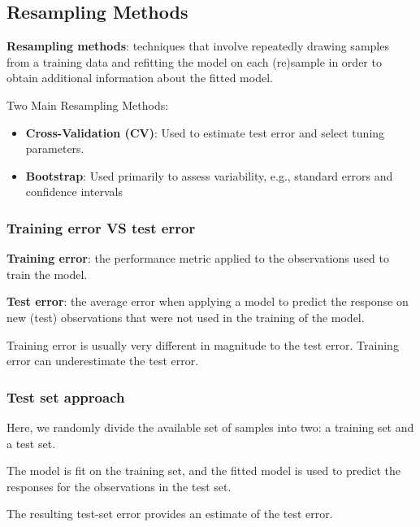 \subsection{Resampling Methods}

\noindent \textbf{Resampling methods}: techniques that involve repeatedly drawing samples from a training data and refitting the model on each (re)sample in order to obtain additional information about the fitted model.

\noindent Two Main Resampling Methods:

\begin{itemize}
    \item \textbf{Cross-Validation (CV)}: Used to estimate test error and select tuning parameters.
    \item \textbf{Bootstrap}: Used primarily to assess variability, e.g., standard errors and confidence intervals
\end{itemize}

\subsubsection{Training error VS test error}

\indent 

\noindent\textbf{Training error}: the performance metric applied to the observations used to train the model.

\noindent\textbf{Test error}: the average error when applying a model to predict the response on new (test) observations that were not used in the training of the model.

\bigskip

Training error is usually very different in magnitude to the test error. Training error can underestimate the test error.

\subsubsection{Test set approach}

\indent 

\step Here, we randomly divide the available set of samples into two: a training set and a test set.

\step The model is fit on the training set, and the fitted model is used to predict the responses for the observations in the test set.

\step The resulting test-set error provides an estimate of the test error.

